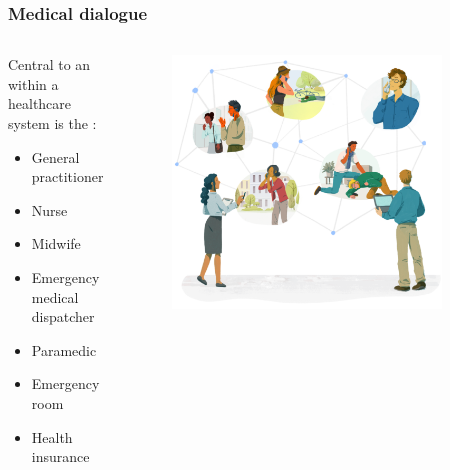 \begin{frame}[t]
    \frametitle{Medical dialogue}
    \begin{columns}[t]
        \begin{column}{0.4\textwidth}
            Central to an  within a healthcare system is the :
            \begin{itemize}
                \item <1> General practitioner
                \item <1> Nurse
                \item <1> Midwife
                \item <1> Emergency medical dispatcher
                \item <1> Paramedic
                \item <1> Emergency room
                \item <1> Health insurance
            \end{itemize}
        \end{column}
        \begin{column}{0.6\textwidth}
            \vspace{-2em}
            \begin{figure}[t]
                \centering
                \includegraphics[width=0.9\textwidth]{figures/corti_sketch_conversations.png}
            \end{figure}
        \end{column}
    \end{columns}

\end{frame}


